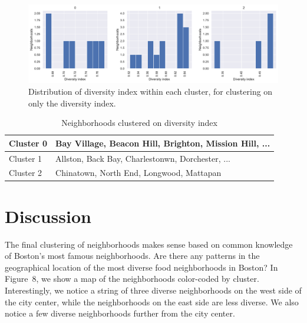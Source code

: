 \documentclass[11pt, a4paper]{article} %
\begin{document}
\begin{figure}
\begin{center}
\includegraphics[width=\textwidth]{hist_diversity.pdf}
\end{center}
\caption{Distribution of diversity index within each cluster, for clustering on only the diversity index.}
\end{figure}

\begin{table}[]
\begin{center}
\begin{tabular}{| l | l |}
\hline
Cluster 0 & Bay Village, Beacon Hill, Brighton, Mission Hill, ... \\
\hline
Cluster 1 & Allston, Back Bay, Charlestonwn, Dorchester, ...      \\
\hline
Cluster 2 & Chinatown, North End, Longwood, Mattapan     \\        
\hline
\end{tabular}
\end{center}
\caption{Neighborhoods clustered on diversity index}
\end{table}

\section{Discussion}

The final clustering of neighborhoods makes sense based on common knowledge of Boston's most famous neighborhoods.
Are there any patterns in the geographical location of the most diverse food neighborhoods in Boston?
In Figure~8, we show a map of the neighborhoods color-coded by cluster.
Interestingly, we notice a string of three diverse neighborhoods on the west side of the city center, while the neighborhoods on the east side are less diverse.
We also notice a few diverse neighborhoods further from the city center.
\end{document}
